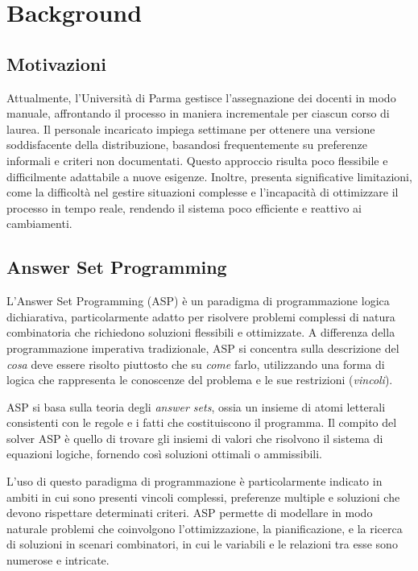 \section{Background}
\subsection{Motivazioni}
Attualmente, l'Università di Parma gestisce l'assegnazione dei docenti in modo
manuale, affrontando il processo in maniera incrementale per ciascun corso di
laurea. Il personale incaricato impiega settimane per ottenere una versione
soddisfacente della distribuzione, basandosi frequentemente su preferenze
informali e criteri non documentati. Questo approccio risulta poco flessibile e
difficilmente adattabile a nuove esigenze. Inoltre, presenta significative
limitazioni, come la difficoltà nel gestire situazioni complesse e l'incapacità
di ottimizzare il processo in tempo reale, rendendo il sistema poco efficiente e
reattivo ai cambiamenti.

\subsection{Answer Set Programming}
L'Answer Set Programming (ASP) è un paradigma di programmazione logica
dichiarativa, particolarmente adatto per risolvere problemi complessi di natura
combinatoria che richiedono soluzioni flessibili e ottimizzate. A differenza
della programmazione imperativa tradizionale, ASP si concentra sulla descrizione
del \textit{cosa} deve essere risolto piuttosto che su	\textit{come} farlo,
utilizzando una forma di logica che rappresenta le conoscenze del problema e le
sue restrizioni (\textit{vincoli}).

ASP si basa sulla teoria degli \textit{answer sets}, ossia un insieme di atomi
letterali consistenti con le regole e i fatti che costituiscono il programma. Il
compito del solver ASP è quello di trovare gli insiemi di valori che risolvono
il sistema di equazioni logiche, fornendo così soluzioni ottimali o ammissibili.

L'uso di questo paradigma di programmazione è particolarmente indicato in ambiti in cui sono presenti vincoli complessi, preferenze multiple e
soluzioni che devono rispettare determinati criteri. ASP permette di modellare
in modo naturale problemi che coinvolgono l'ottimizzazione, la pianificazione, e
la ricerca di soluzioni in scenari combinatori, in cui le variabili e le
relazioni tra esse sono numerose e intricate.


